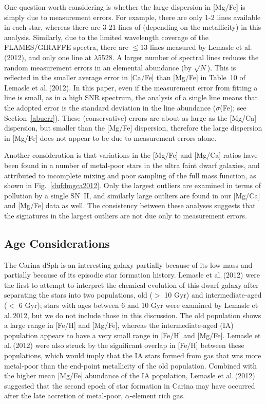 \documentclass{emulateapj}
\newcommand\etal{{\rm et al.\,}}
\begin{document}
One question worth considering is whether the large dispersion in [Mg/Fe] is
simply due to measurement errors.    
For example, there are only 1-2  lines available in each star, 
whereas there are 3-21 lines of  (depending on the metallicity) in this analysis. 
Similarly, due to the limited wavelength coverage of the FLAMES/GIRAFFE spectra, 
there are $\le$13  lines measured by Lemasle \etal (2012), and only 
one  line at $\lambda$5528.    A larger number of spectral lines reduces 
the random measurement errors in an elemental abundance (by $\sqrt{N}$).
This is reflected in the smaller average error in [Ca/Fe] than [Mg/Fe] in
Table~10 of Lemasle \etal (2012).
In this paper, even if the measurement error from fitting a 
line is small, as in a high SNR spectrum, the analysis of a single line 
means that the adopted error is the standard deviation in the  
line abundance ($\sigma$(Fe); see Section~\ref{abuerr}).
These (conservative) errors are about as large as the [Mg/Ca] dispersion,
but smaller than the [Mg/Fe] dispersion, therefore the large dispersion 
in [Mg/Fe] does not appear to be due to measurement errors alone.
 
Another consideration is that variations in the [Mg/Fe] and [Mg/Ca] ratios 
have been found in a number of metal-poor stars in the ultra faint dwarf galaxies, 
and attributed to incomplete mixing and poor sampling of the full mass function,
as shown in Fig.~\ref{dufdmgca2012}.  Only the largest outliers are examined in
terms of pollution by a single SN~II, and similarly large outliers are found in
our [Mg/Ca] and [Mg/Fe] data as well.
The consistency between these analyses suggests that the signatures in the
largest outliers are not due only to measurement errors.




\subsection {Age Considerations}

The Carina dSph is an interesting galaxy partially because of its low mass and
partially because of its episodic star formation history.    Lemasle \etal (2012)
were the first to attempt to interpret the chemical evolution of this dwarf galaxy
after separating the stars into two populations, old ($>$ 10 Gyr) and 
intermediate-aged ($<$ 6 Gyr); 
stars with ages between 6 and 10 Gyr were examined
by Lemasle \etal 2012, but we do not include those in this discussion.   
The old population shows a large range in 
[Fe/H] and [Mg/Fe], whereas the intermediate-aged (IA) population appears to 
have a very small range in [Fe/H] and [Mg/Fe].     Lemasle \etal (2012) were 
also struck by the significant overlap in [Fe/H] between these populations,
which would imply that the IA stars formed from gas that was more metal-poor 
than the end-point metallicity of the old population.     Combined with
the higher mean [Mg/Fe] abundance of the IA population, Lemasle \etal (2012)
suggested that the second epoch of star formation in Carina may have 
occurred after the late accretion of metal-poor, $\alpha$-element rich gas.
\end{document}
